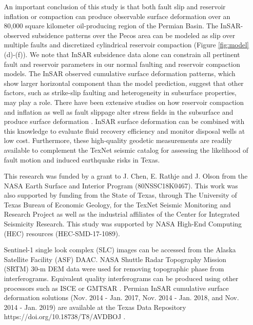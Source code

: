 \documentclass[draft]{agujournal2019}
\begin{document}
An important conclusion of this study is that both fault slip and reservoir inflation or compaction can produce observable surface deformation over an 80,000 square kilometer oil-producing region of the Permian Basin. The InSAR-observed subsidence patterns over the Pecos area can be modeled as slip over multiple faults and discretized cylindrical reservoir compaction (Figure \ref{fig:model} (d)-(f)). We note that InSAR subsidence data alone can constrain all pertinent fault and reservoir parameters in our normal faulting and reservoir compaction models. The InSAR observed cumulative surface deformation patterns, which show larger horizontal component than the model prediction, suggest that other factors, such as strike-slip faulting and heterogeneity in subsurface properties, may play a role. There have been extensive studies on how reservoir compaction and inflation as well as fault slippage alter stress fields in the subsurface and produce surface deformation \cite{Geertsma1973, Segall1992, Okada1992, Du1992,Vasco2005, Vasco2008, Khakim2012}. InSAR surface deformation can be combined with this knowledge to evaluate fluid recovery efficiency and monitor disposal wells at low cost. Furthermore, these high-quality geodetic measurements are readily available to complement the TexNet seismic catalog for assessing the likelihood of fault motion and induced earthquake risks in Texas.

\acknowledgments
This research was funded by a grant to J. Chen, E. Rathje and J. Olson from the NASA Earth Surface and Interior Program (80NSSC18K0467). This work was also supported by funding from the State of Texas, through The University of Texas Bureau of Economic Geology, for the TexNet Seismic Monitoring and Research Project as well as the industrial affiliates of the Center for Integrated Seismicity Research. This study was supported by NASA High-End Computing (HEC) resources (HEC-SMD-17-1089). 

Sentinel-1 single look complex (SLC) images can be accessed from the Alaska Satellite Facility (ASF) DAAC. NASA Shuttle Radar Topography Mission (SRTM) 30-m DEM data \cite{nasa2013nasa} were used for removing topographic phase from interferograms. Equivalent quality interferograms can be produced using other processors such as ISCE \cite{rosen2012insar} or GMTSAR \cite{sandwell2011open}. Permian InSAR cumulative surface deformation solutions (Nov. 2014 - Jan. 2017, Nov. 2014 - Jan. 2018, and Nov. 2014 - Jan. 2019) are available at the Texas Data Repository https://doi.org/10.18738/T8/AVDBOJ .
\end{document}
